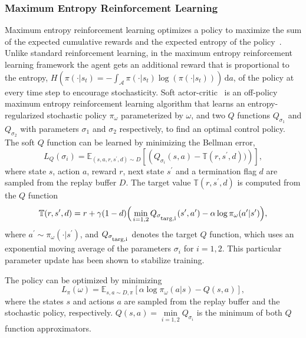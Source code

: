 \documentclass[a4paper,12pt]{article}
\begin{document}
\subsubsection{Maximum Entropy Reinforcement Learning}
Maximum entropy reinforcement learning optimizes a policy to maximize the sum of the expected cumulative rewards and the expected entropy of the policy~\cite{ziebart2008maximum}. Unlike standard reinforcement learning, in the maximum entropy reinforcement learning framework the agent gets an additional reward that is proportional to the entropy, $H(\pi(\cdot |s_t) = - \int_\mathcal{A} \pi(\cdot|s_t)\log(\pi(\cdot|s_t))) \, \mathrm{d}a$, of the policy at every time step to encourage stochasticity. Soft actor-critic~\cite{haarnoja2018soft} is an off-policy maximum entropy reinforcement learning algorithm that learns an entropy-regularized stochastic policy $\pi_\omega$ parameterized by $\omega$, and two $Q$ functions $Q_{\sigma_1}$ and $Q_{\sigma_2}$ with parameters $\sigma_1$ and $\sigma_2$ respectively, to find an optimal control policy. The soft $Q$ function can be learned by minimizing the Bellman error,
\begin{equation}\label{eq:Q loss}
    L_Q(\sigma_i) = \mathbb{E}_{(s,a,r,s^\prime,d) \sim D}  \left[ \left( Q_{\sigma_i}(s,a) - \mathbb{T}(r, s^\prime,d))\right)\right],
\end{equation}
where state $s$, action $a$, reward $r$, next state $s^\prime$ and a termination flag $d$ are sampled from the replay buffer $D$. The target value $\mathbb{T}(r, s^\prime, d)$ is computed from the $Q$ function
\begin{equation}
    \mathbb{T}(r, s^\prime,d) = r + \gamma(1-d) \Big( \min_{i=1,2} Q_{\sigma_{\textsubscript {targ,i}}}(s^\prime, a^\prime) - \alpha \log \pi_\omega(a^\prime | s^\prime) \Big),
\end{equation}
where $a^\prime \sim \pi_\omega(\cdot | s^\prime)$, and $Q_{\sigma_{\textsubscript {targ,i}}}$ denotes the target $Q$ function, which uses an exponential moving average of the parameters $\sigma_i$ for $i=1,2$. This particular parameter update has been shown to stabilize training.

The policy can be optimized by minimizing
\begin{equation}\label{eq:policy loss}
    L_\pi(\omega) = \mathbb{E}_{s,a \sim D,\pi}[\alpha \log \pi_\omega(a | s) - Q(s,a)],
\end{equation}
where the states $s$ and actions $a$ are sampled from the replay buffer and the stochastic policy, respectively. $Q(s,a) = \min\limits_{i=1,2} Q_{\sigma_i}$ is the minimum of both $Q$ function approximators.
\end{document}
